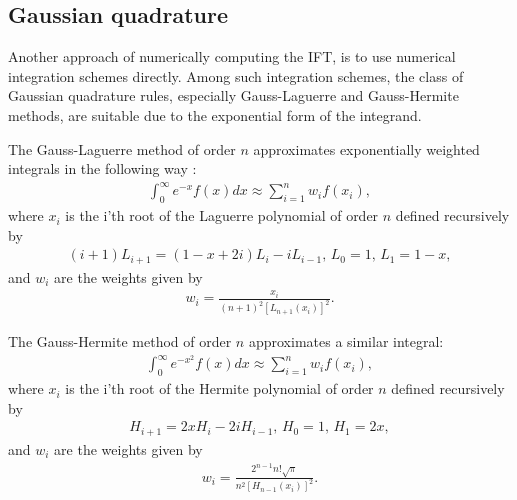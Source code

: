 %


\subsection{Gaussian quadrature}
Another approach of numerically computing the IFT, is to use numerical integration schemes directly.
Among such integration schemes, the class of Gaussian quadrature rules, especially Gauss-Laguerre and Gauss-Hermite methods, are suitable due to the exponential form of the integrand.

The Gauss-Laguerre method of order $n$ approximates exponentially weighted integrals in the following way \citep{pressnumerical}:
\begin{align}
\int_0^\infty e^{-x}f(x)dx \approx \sum_{i=1}^{n}w_i f(x_i),
\end{align}
where $x_i$ is the i'th root of the Laguerre polynomial of order $n$ defined recursively by
\begin{align}
(i+1)L_{i+1} = (1-x+2i)L_i - iL_{i-1},\,L_0=1,\, L_1 = 1-x,
\end{align}
and $w_i$ are the weights given by
\begin{align}\label{gl-qudrature weights}
w_i = \frac{x_i}{(n+1)^2 \left[L_{n+1}(x_i)\right]^2}.
\end{align}

The Gauss-Hermite method of order $n$ approximates a similar integral:
\begin{align}
\int_0^\infty e^{-x^2}f(x)dx \approx \sum_{i=1}^{n}w_i f(x_i),
\end{align}
where $x_i$ is the i'th root of the Hermite  polynomial of order $n$ defined recursively by
\begin{align}
H_{i+1} = 2xH_i - 2iH_{i-1},\,H_{0}=1,\, H_1 = 2x,
\end{align}
and $w_i$ are the weights given by
\begin{align}\label{gl-qudrature weights}
w_i = \frac{2^{n-1}n!\sqrt{\pi}}
{n^2 \left[H_{n-1}(x_i)\right]^2}.
\end{align}

